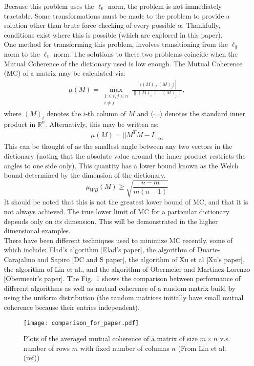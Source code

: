 \documentclass[journal]{IEEEtran}
\begin{document}
Because this problem uses the $\ell_0$ norm, the problem is not immediately tractable. Some transformations
must be made to the problem to provide a solution other than brute force checking of every possible
$\alpha$. Thankfully, conditions exist where this is possible (which are explored in this paper). \\
One method for transforming this problem, involves transitioning from the $\ell_0$ norm to the $\ell_1$ norm.
The solutions to these two problems coincide when the Mutual Coherence of the dictionary used is low 
enough. The Mutual Coherence (MC) of a matrix may be calculated via:
\begin{align}
\mu(M)=\max\limits_{\substack{1\leq i,j \leq n \\ i\neq j}}\frac{|\langle (M)_i, (M)_j \rangle |}{\|(M)_i\| \|(M)_j\|},
\end{align}
where $ (M)_i$ denotes the $i$-th column of $M$ and $\langle\cdot , \cdot \rangle $ denotes the standard inner product in $\mathbb{R}^n$. 
Alternativly, this may be written as:
\begin{align}
    \mu(M) = ||M^T M - I||_\infty
\end{align}
This can be thought of as the smallest angle between any two vectors in the dictionary (noting that
the absolute value around the inner product restricts the angles to one side only). This quantity
has a lower bound known as the Welch bound determined by the dimension of the dictionary.
\begin{equation}
\mu_{WB}(M) \geq \sqrt{\frac{n - m}{m(n-1)}}
\end{equation}
It should be noted that this is not the greatest lower bound of MC, and that it is not always
achieved. The true lower limit of MC for a particular dictionary depends only on its dimension. This will be demonstrated in the higher dimensional examples. \\
There have been different techniques used to minimize MC recently, some of which include: Elad's algorithm [Elad's paper], the algorithm of Duarte-Carajalino and Sapiro [DC and S paper], the algorithm of Xu et al [Xu's paper], the algorithm of Lin et al., and the algorithm of Obermeier and Martinez-Lorenzo [Obermeeir's paper]. The Fig.~1 shows the comparison between performance of different algorithms as well as mutual coherence of a random matrix build by using the uniform distribution (the random matrices initially have small mutual coherence because their entries independent).  \\
\begin{figure}[!h]
\centering
\texttt{[image: comparison\_for\_paper.pdf]}
\caption{Plots of the averaged mutual coherence of a matrix of size $m \times n$ v.s. number of rows $m$ with fixed number of columns $n$ (From Lin et al. (ref))}
\label{Fig:comp_of_algtms}
\end{figure}
\end{document}
